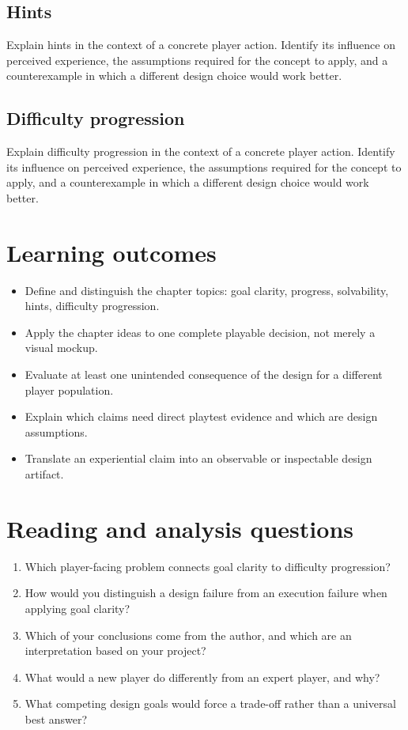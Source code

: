 \documentclass[11pt]{article}
\begin{document}
\subsection{Hints}
Explain hints in the context of a concrete player action. Identify its influence on perceived experience, the assumptions required for the concept to apply, and a counterexample in which a different design choice would work better.


\subsection{Difficulty progression}
Explain difficulty progression in the context of a concrete player action. Identify its influence on perceived experience, the assumptions required for the concept to apply, and a counterexample in which a different design choice would work better.


\section{Learning outcomes}
\begin{itemize}
\item Define and distinguish the chapter topics: goal clarity, progress, solvability, hints, difficulty progression.
\item Apply the chapter ideas to one complete playable decision, not merely a visual mockup.
\item Evaluate at least one unintended consequence of the design for a different player population.
\item Explain which claims need direct playtest evidence and which are design assumptions.
\item Translate an experiential claim into an observable or inspectable design artifact.
\end{itemize}

\section{Reading and analysis questions}
\begin{enumerate}
\item Which player-facing problem connects goal clarity to difficulty progression?
\item How would you distinguish a design failure from an execution failure when applying goal clarity?
\item Which of your conclusions come from the author, and which are an interpretation based on your project?
\item What would a new player do differently from an expert player, and why?
\item What competing design goals would force a trade-off rather than a universal best answer?
\end{enumerate}
\end{document}
